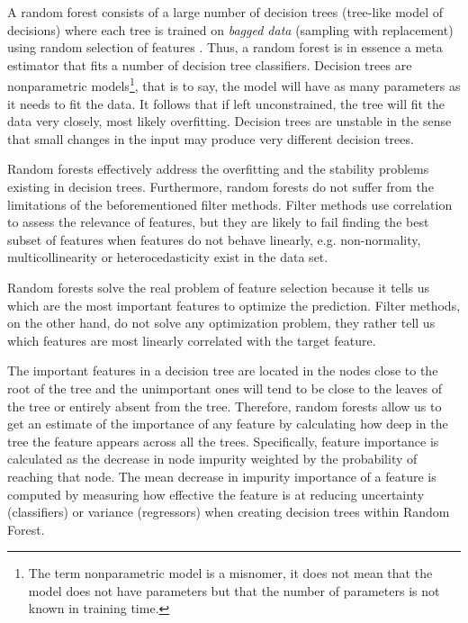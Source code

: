\documentclass[preprint,12pt]{elsarticle}
\begin{document}
A random forest consists of a large number of decision trees (tree-like model of decisions) where each tree is trained on \emph{bagged data} (sampling with replacement) using random selection of features \cite{trevor2009elements}. Thus, a random forest is in essence a meta estimator that fits a number of decision tree classifiers. 
Decision trees are nonparametric models\footnote{The term nonparametric model is a misnomer, it does not mean that the model does not have parameters but that the number of parameters is not known in training time.}, that is to say, the model will have as many parameters as it needs to fit the data. It follows that if left unconstrained, the tree will fit the data very closely, most likely overfitting. Decision trees are unstable in the sense that small changes in the input may produce very different decision trees.

Random forests effectively address the overfitting and the stability problems existing in decision trees. Furthermore, random forests do not suffer from the limitations of the beforementioned filter methods. Filter methods use correlation to assess the relevance of features, but they are likely to fail finding the best subset of features when features do not behave linearly, e.g. non-normality, multicollinearity or heterocedasticity \cite{ratkowsky1990handbook} exist in the data set. 

Random forests solve the real problem of feature selection because it tells us which are the most important features to optimize the prediction. Filter methods, on the other hand, do not solve any optimization problem, they rather tell us which features are most linearly correlated with the target feature. 

The important features in a decision tree are located in the nodes close to the root of the tree and the unimportant ones will tend to be close to the leaves of the tree or entirely absent from the tree. Therefore, random forests allow us to get an estimate of the importance of any feature by calculating how deep in the tree the feature appears across all the trees. 
Specifically, feature importance is calculated as the decrease in node impurity weighted by the probability of reaching that node. The mean decrease in impurity importance of a feature is computed by measuring how effective the feature is at reducing uncertainty (classifiers) or variance (regressors) when creating decision trees within Random Forest. 
\end{document}

